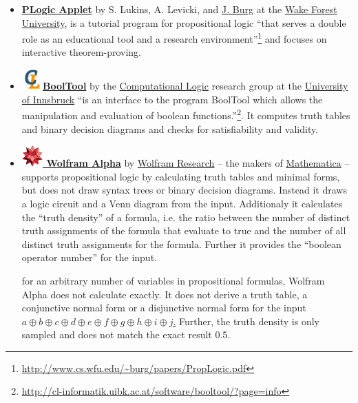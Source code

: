 \begin{itemize}
\item 
\href{http://www.cs.wfu.edu/~burg/JavaPackages/indexswingnet.html}{\bf PLogic Applet} 
by S. Lukins, A. Levicki, and 
\href{http://www.cs.wfu.edu/~burg}{J. Burg} at the
\href{http://www.cs.wfu.edu}{Wake Forest University}, is a
tutorial program for propositional logic 
“that serves a double role as an educational tool and a research environment”\footnote {
\url{http://www.cs.wfu.edu/~burg/papers/PropLogic.pdf}} and focuses 
 on interactive theorem-proving.

\item
\href{http://cl-informatik.uibk.ac.at/software/booltool/}{\bf 
\includegraphics[width=0.8cm]{clshortlogo_new.pdf}BoolTool} 
by the 
\href{http://cl-informatik.uibk.ac.at/}{Computational Logic} 
research group at the 
\href{http://informatik.uibk.ac.at}{University of Innsbruck}
“is an interface to the program BoolTool which allows the manipulation and evaluation of boolean functions.”\footnote{
\url{http://cl-informatik.uibk.ac.at/software/booltool/?page=info}}. 
It computes truth tables and binary decision diagrams and checks for satisfiability and validity.

\item
\href{http://www.wolframalpha.com/input/?i=a+or+b+and+c}{\bf 
\includegraphics[width=0.8cm]{related/WolframAlpha.jpg} Wolfram Alpha} 
by 
\href{http://www.wolfram.com/}{Wolfram Research} – the makers of 
\href{http://www.wolfram.com/mathematica/}{Mathematica} – supports
propositional logic by calculating truth tables and minimal forms, 
but does not draw syntax trees or binary decision diagrams.
Instead it draws a logic circuit and a Venn diagram from the input. 
Additionaly it calculates the “truth density” of a formula, 
i.e. the ratio between the number of distinct truth assignments of the formula that evaluate to true 
and the number of all distinct truth assignments for the formula.
Further it provides the “boolean operator number” for the input. 

for an arbitrary number of variables in propositional formulas, Wolfram Alpha does not calculate exactly.
It does not derive a truth table, a conjunctive normal form or a disjunctive normal form 
for the input
\href{http://www.wolframalpha.com/input/?i=a+xor+b+xor+c+xor+d+xor+e+xor+f+xor+g+xor+h+xor+i+xor+j}{
$a\oplus b\oplus c\oplus d\oplus e\oplus f\oplus g\oplus h\oplus i\oplus j$.}
Further, the truth density is only sampled and does not match the exact result 0.5.
\end{itemize}

